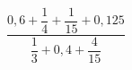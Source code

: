 \begin{ex}[type=calculate]
	\begin{condition}
		\( \dfrac{0,6+\dfrac{1}{4}+\dfrac{1}{15}+0,125}{\dfrac{1}{3}+0,4+\dfrac{4}{15}} \)
	\end{condition}
	\answer{}
\end{ex}